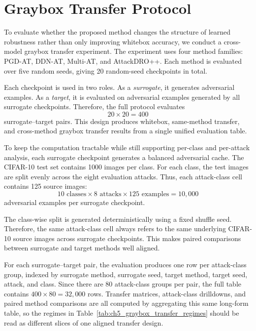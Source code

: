 \section{Graybox Transfer Protocol}
\label{sec:ch5_graybox_protocol}

To evaluate whether the proposed method changes the structure of learned robustness
rather than only improving whitebox accuracy, we conduct a cross-model graybox transfer
experiment. The experiment uses four method families: PGD-AT,
DDN-AT, Multi-AT, and AttackDRO++.
Each method is evaluated over five random seeds, giving 20 random-seed
checkpoints in total.

Each checkpoint is used in two roles. As a \emph{surrogate}, it generates adversarial
examples. As a \emph{target}, it is evaluated on adversarial examples generated by all
surrogate checkpoints. Therefore, the full protocol evaluates
\[
    20 \times 20 = 400
\]
surrogate--target pairs. This design produces whitebox, same-method transfer, and
cross-method graybox transfer results from a single unified evaluation table.

To keep the computation tractable while still supporting per-class and per-attack
analysis, each surrogate checkpoint generates a balanced adversarial cache. The CIFAR-10
test set contains 1000 images per class. For each class, the test images are split evenly
across the eight evaluation attacks. Thus, each attack-class cell contains 125 source
images:
\[
    10 \text{ classes}
    \times
    8 \text{ attacks}
    \times
    125 \text{ examples}
    =
    10{,}000
\]
adversarial examples per surrogate checkpoint.

The class-wise split is generated deterministically using a fixed shuffle seed. Therefore,
the same attack-class cell always refers to the same underlying CIFAR-10 source images
across surrogate checkpoints. This makes paired comparisons between surrogate and
target methods well aligned.

For each surrogate--target pair, the evaluation produces one row per attack-class group,
indexed by surrogate method, surrogate seed, target method, target seed, attack, and
class. Since there are 80 attack-class groups per pair, the full table contains
\(400 \times 80 = 32{,}000\) rows. Transfer matrices, attack-class drilldowns, and
paired method comparisons are all computed by aggregating this same long-form table, so
the regimes in Table~\ref{tab:ch5_graybox_transfer_regimes} should be read as different
slices of one aligned transfer design.

